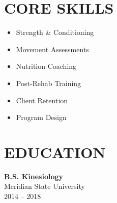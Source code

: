 \documentclass[10pt]{article}
\begin{document}
\begin{minipage}[t]{0.28\textwidth}
  \section*{CORE SKILLS}
  \vspace{4pt}
  {\color{bodytext}\small
  \begin{itemize}
    \item Strength \& Conditioning
    \item Movement Assessments
    \item Nutrition Coaching
    \item Post-Rehab Training
    \item Client Retention
    \item Program Design
  \end{itemize}
  }
  
  \section*{EDUCATION}
  \vspace{4pt}
  {\bfseries\color{primary} B.S. Kinesiology} \\
  {\small\color{bodytext} Meridian State University} \\
  {\color{bodytext}\small 2014 -- 2018}
  
\end{minipage}%
\hfill%
\end{document}
